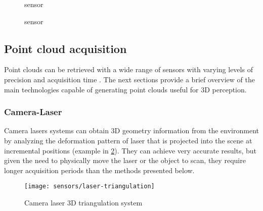\begin{figure}[H]
	\begin{floatrow}[2]
		{\caption[ sensor]{ sensor\protect\footnotemark}\label{fig:ccd}}
		{\caption[ sensor]{ sensor\protect\footnotemark}\label{fig:cmos}}
	\end{floatrow}
\end{figure}


\subsection{Point cloud acquisition}\label{sec:point-cloud-acquisition}

Point clouds can be retrieved with a wide range of sensors with varying levels of precision and acquisition time \cite{Sansoni2009}. The next sections provide a brief overview of the main technologies capable of generating point clouds useful for 3D perception.


\subsubsection{Camera-Laser}

Camera lasers systems can obtain 3D geometry information from the environment by analyzing the deformation pattern of laser that is projected into the scene at incremental positions (example in \cref{fig:laser-triangulation}). They can achieve very accurate results, but given the need to physically move the laser or the object to scan, they require longer acquisition periods than the methods presented below.

\begin{figure}[H]
	\centering
	\texttt{[image: sensors/laser-triangulation]}
	\caption[Camera laser 3D triangulation system]{Camera laser 3D triangulation system\protect\footnotemark}
	\label{fig:laser-triangulation}
\end{figure}


